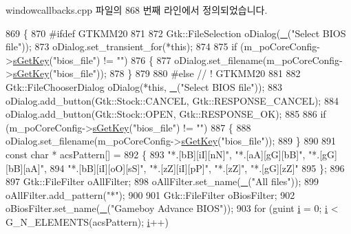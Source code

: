 windowcallbacks.\+cpp 파일의 868 번째 라인에서 정의되었습니다.


\begin{DoxyCode}
869 \{
870 \textcolor{preprocessor}{#ifdef GTKMM20}
871 
872   Gtk::FileSelection oDialog(\mbox{\hyperlink{getopt_8c_a86a239addea586602343007a370bf8ad}{\_}}(\textcolor{stringliteral}{"Select BIOS file"}));
873   oDialog.set\_transient\_for(*\textcolor{keyword}{this});
874 
875   \textcolor{keywordflow}{if} (m\_poCoreConfig->\mbox{\hyperlink{class_v_b_a_1_1_config_1_1_section_a7ac9dfabf38bc1db83a6017e130f04ac}{sGetKey}}(\textcolor{stringliteral}{"bios\_file"}) != \textcolor{stringliteral}{""})
876   \{
877     oDialog.set\_filename(m\_poCoreConfig->\mbox{\hyperlink{class_v_b_a_1_1_config_1_1_section_a7ac9dfabf38bc1db83a6017e130f04ac}{sGetKey}}(\textcolor{stringliteral}{"bios\_file"}));
878   \}
879 
880 \textcolor{preprocessor}{#else // ! GTKMM20}
881 
882   Gtk::FileChooserDialog oDialog(*\textcolor{keyword}{this}, \mbox{\hyperlink{getopt_8c_a86a239addea586602343007a370bf8ad}{\_}}(\textcolor{stringliteral}{"Select BIOS file"}));
883   oDialog.add\_button(Gtk::Stock::CANCEL, Gtk::RESPONSE\_CANCEL);
884   oDialog.add\_button(Gtk::Stock::OPEN,   Gtk::RESPONSE\_OK);
885 
886   \textcolor{keywordflow}{if} (m\_poCoreConfig->\mbox{\hyperlink{class_v_b_a_1_1_config_1_1_section_a7ac9dfabf38bc1db83a6017e130f04ac}{sGetKey}}(\textcolor{stringliteral}{"bios\_file"}) != \textcolor{stringliteral}{""})
887   \{
888     oDialog.set\_filename(m\_poCoreConfig->\mbox{\hyperlink{class_v_b_a_1_1_config_1_1_section_a7ac9dfabf38bc1db83a6017e130f04ac}{sGetKey}}(\textcolor{stringliteral}{"bios\_file"}));
889   \}
890 
891   \textcolor{keyword}{const} \textcolor{keywordtype}{char} * acsPattern[] =
892   \{
893     \textcolor{stringliteral}{"*.[bB][iI][nN]"}, \textcolor{stringliteral}{"*.[aA][gG][bB]"}, \textcolor{stringliteral}{"*.[gG][bB][aA]"},
894     \textcolor{stringliteral}{"*.[bB][iI][oO][sS]"}, \textcolor{stringliteral}{"*.[zZ][iI][pP]"}, \textcolor{stringliteral}{"*.[zZ]"}, \textcolor{stringliteral}{"*.[gG][zZ]"}
895   \};
896 
897   Gtk::FileFilter oAllFilter;
898   oAllFilter.set\_name(\mbox{\hyperlink{getopt_8c_a86a239addea586602343007a370bf8ad}{\_}}(\textcolor{stringliteral}{"All files"}));
899   oAllFilter.add\_pattern(\textcolor{stringliteral}{"*"});
900 
901   Gtk::FileFilter oBiosFilter;
902   oBiosFilter.set\_name(\mbox{\hyperlink{getopt_8c_a86a239addea586602343007a370bf8ad}{\_}}(\textcolor{stringliteral}{"Gameboy Advance BIOS"}));
903   \textcolor{keywordflow}{for} (guint \mbox{\hyperlink{expr-lex_8cpp_acb559820d9ca11295b4500f179ef6392}{i}} = 0; \mbox{\hyperlink{expr-lex_8cpp_acb559820d9ca11295b4500f179ef6392}{i}} < G\_N\_ELEMENTS(acsPattern); \mbox{\hyperlink{expr-lex_8cpp_acb559820d9ca11295b4500f179ef6392}{i}}++)

\end{DoxyCode}
